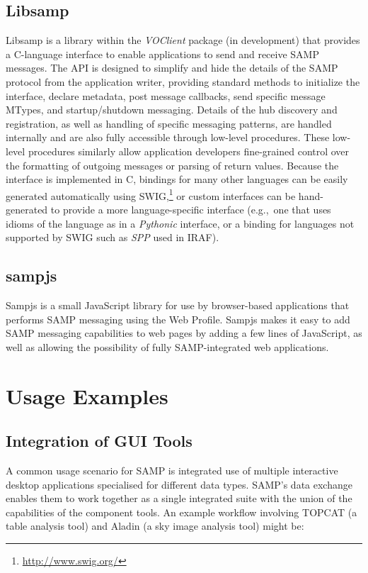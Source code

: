 \subsection{Libsamp}

Libsamp is a library within the {\em VOClient\/} package (in development) that provides a C-language interface to enable applications to send and receive SAMP messages.  The API is designed to simplify and hide the details of the SAMP protocol from the application writer, providing standard methods to initialize the interface, declare metadata, post message callbacks, send specific message MTypes, and startup/shutdown messaging. Details of the hub discovery and registration, as well as handling of specific messaging patterns, are handled internally and are also fully accessible through low-level procedures.  These low-level procedures similarly allow application developers fine-grained control over the formatting of outgoing messages or parsing of return values.  Because the interface is implemented in C, bindings for many other languages can be easily generated automatically using SWIG,\footnote{\url{http://www.swig.org/}} or custom interfaces can be hand-generated to provide a more language-specific interface (e.g.,\ one that uses idioms of the language as in a {\em Pythonic\/} interface, or a binding for languages not supported by SWIG such as {\em SPP\/} used in IRAF).

\subsection{sampjs}

Sampjs is a small JavaScript library for use by browser-based applications that performs SAMP messaging using the Web Profile. Sampjs makes it easy to add SAMP messaging capabilities to web pages by adding a few lines of JavaScript, as well as allowing the possibility of fully SAMP-integrated web applications.

\section{Usage Examples}
\label{sec:B2_usage}

\subsection{Integration of GUI Tools}

A common usage scenario for SAMP is integrated use of multiple interactive desktop applications specialised for different data types. SAMP's data exchange enables them to work together as a single integrated suite with the union of the capabilities of the component tools. An example workflow involving TOPCAT (a table analysis tool) and Aladin (a sky image analysis tool) might be: 

